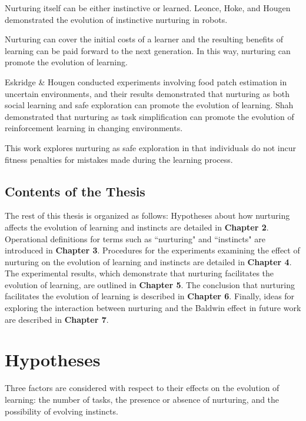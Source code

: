 \documentclass[master]{outhesis}
\begin{document}
Nurturing itself can be either instinctive or learned.
Leonce, Hoke, and Hougen \cite{evolution-of-nurturing} demonstrated the evolution of instinctive nurturing in robots.


Nurturing can cover the initial costs of a learner and the resulting benefits of learning can be paid forward to the next generation.
In this way, nurturing can promote the evolution of learning.

Eskridge \& Hougen \cite{eskridge-learning-uncertain-environments} conducted experiments involving food patch estimation in uncertain environments,
and their results demonstrated that nurturing as both social learning and safe exploration can promote the evolution of learning.
Shah \cite{Shah:2015hs} demonstrated that nurturing as task simplification can promote the evolution of reinforcement learning in changing environments.

This work explores nurturing as safe exploration in that individuals do not incur fitness penalties for mistakes made during the learning process.

\section{Contents of the Thesis}

The rest of this thesis is organized as follows:
Hypotheses about how nurturing affects the evolution of learning and instincts are detailed in \textbf{Chapter 2}. 
Operational definitions for terms such as ``nurturing" and ``instincts" are introduced in \textbf{Chapter 3}.
Procedures for the experiments examining the effect of nurturing on the evolution of learning and instincts are detailed in \textbf{Chapter 4}.
The experimental results, which demonstrate that nurturing facilitates the evolution of learning, are outlined in \textbf{Chapter 5}. 
The conclusion that nurturing facilitates the evolution of learning is described in \textbf{Chapter 6}. 
Finally, ideas for exploring the interaction between nurturing and the Baldwin effect in future work are described in \textbf{Chapter 7}.

\chapter{Hypotheses}

Three factors are considered with respect to their effects on the evolution of learning: the number of tasks, the presence or absence of nurturing, and the possibility of evolving instincts.
\end{document}
